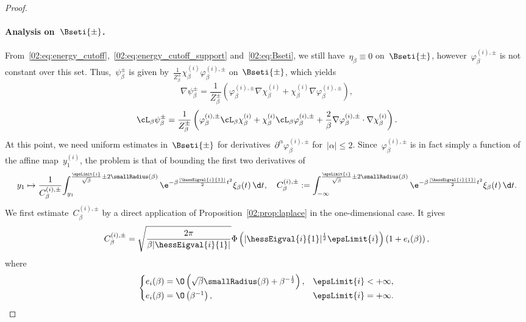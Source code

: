 \begin{proof}
            \paragraph{Analysis on~$\Bseti{\pm}$.\newline}
            From~\eqref{02:eq:energy_cutoff},~\eqref{02:eq:energy_cutoff_support} and~\eqref{02:eq:Bseti}, we still have~$\eta_\beta \equiv 0$ on~$\Bseti{\pm}$, however~$\varphi_\beta^{(i),\pm}$ is not constant over this set. Thus,~$\psi_\beta^{\pm}$ is given by~$\frac1{Z_\beta^\pm}\chi_\beta^{(i)}\varphi_\beta^{(i),\pm}$ on~$\Bseti{\pm}$, which yields
            \[\nabla\psi_\beta^{\pm} = \frac1{Z_\beta^\pm}\left(\varphi_\beta^{(i),\pm}\nabla\chi_\beta^{(i)}+\chi_\beta^{(i)}\nabla\varphi_\beta^{(i),\pm}\right),\]
            \[ \cL_\beta\psi_\beta^{\pm} = \frac1{Z_\beta^\pm}\left(\varphi_\beta^{(i),\pm}\cL_\beta\chi_\beta^{(i)}+\chi_\beta^{(i)}\cL_\beta\varphi_\beta^{(i),\pm}+\frac2\beta\nabla\varphi_\beta^{(i),\pm}\cdot\nabla\chi_\beta^{(i)}\right).\]
            At this point, we need uniform estimates in~$\Bseti{\pm}$ for derivatives~$\partial^{\alpha}\varphi_\beta^{(i),\pm}$ for~$|\alpha|\leq 2$. Since~$\varphi_\beta^{(i),\pm}$ is in fact simply a function of the affine map~$y_1^{(i)}$, the problem is that of bounding the first two derivatives of
            \[y_1 \mapsto \frac1{C_\beta^{(i),\pm}}{\displaystyle\int_{y_1}^{\frac{\epsLimit{i}}{\sqrt\beta}\pm2\smallRadius(\beta)} \e^{-\beta\frac{|\hessEigval{i}{1}|}{2}t^2} \xi_\beta(t)\,\d t},\quad C_\beta^{(i),\pm}:={\displaystyle\int_{-\infty}^{\frac{\epsLimit{i}}{\sqrt\beta}\pm2\smallRadius(\beta)} \e^{-\beta\frac{|\hessEigval{i}{1}|}{2}t^2} \xi_\beta(t)\,\d t}.\]
            We first estimate~$C_\beta^{(i),\pm}$ by a direct application of Proposition~\ref{02:prop:laplace} in the one-dimensional case.
            It gives
            \begin{equation}
                \label{02:eq:c_beta_asymptotic}
                C_\beta^{(i),\pm} = \sqrt{\frac{2\pi}{\beta|\hessEigval{i}{1}|}}\Phi\left(|\hessEigval{i}{1}|^{\frac12}\epsLimit{i}\right)\left(1+e_i(\beta)\right),
            \end{equation}
            where
            \begin{equation}
            \label{02:eq:c_beta_error}
            \begin{cases}
                e_i(\beta) = \O\left(\sqrt\beta\smallRadius(\beta) + \beta^{-\frac12}\right),&\epsLimit{i}<+\infty,\\
                e_i(\beta) = \O\left(\beta^{-1}\right),&\epsLimit{i}=+\infty.

\end{cases}
\end{equation}
\end{proof}
